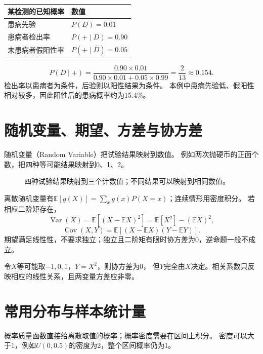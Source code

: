 \begin{center}
\begin{tabularx}{\textwidth}{P{43mm}Y}
\toprule
某检测的已知概率 & 数值\\
\midrule
患病先验 & $P(D)=0.01$\\
患病者检出率 & $P(+\mid D)=0.90$\\
未患病者假阳性率 & $P(+\mid\bar D)=0.05$\\
\bottomrule
\end{tabularx}
\end{center}
\[
 P(D\mid+)=\frac{0.90\times0.01}{0.90\times0.01+0.05\times0.99}
 =\frac2{13}\approx0.154.
\]
检出率以患病者为条件，后验则以阳性结果为条件。
本例中患病先验低、假阳性相对较多，因此阳性后的患病概率约为15.4\%。


\section{随机变量、期望、方差与协方差}
\label{sec:math-random}
随机变量（Random Variable）把试验结果映射到数值。
例如两次抛硬币的正面个数，把四种等可能结果映射到0、1、2。

\begin{figure}[htbp]
\centering
\caption{四种试验结果映射到三个计数值；不同结果可以映射到相同数值。}
\par\smallskip
{}
\end{figure}

离散随机变量有$\mathbb E[g(X)]=\sum_x g(x)P(X=x)$；连续情形用密度积分。
若相应二阶矩存在，
\[
 \operatorname{Var}(X)=\mathbb E[(X-\mathbb E X)^2]=\mathbb E[X^2]-(\mathbb E X)^2,
\]
\[
 \operatorname{Cov}(X,Y)=\mathbb E[(X-\mathbb E X)(Y-\mathbb E Y)].
\]
期望满足线性性，不要求独立；独立且二阶矩有限时协方差为0，逆命题一般不成立。

\begin{pitfall}[零相关仍可能有确定依赖]
令$X$等可能取$-1,0,1$，$Y=X^2$，则协方差为0，
但$Y$完全由$X$决定。相关系数只反映相应的线性关系，且两变量方差应非零。
\end{pitfall}

\section{常用分布与样本统计量}
\label{sec:math-distributions}
概率质量函数直接给离散取值的概率；概率密度需要在区间上积分。
密度可以大于1，例如$U(0,0.5)$的密度为2，整个区间概率仍为1。

